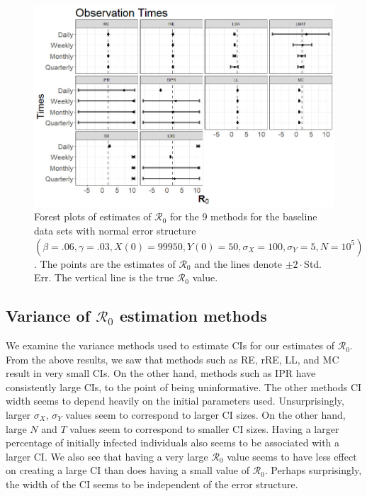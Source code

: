 \documentclass[12pt]{article}
\newcommand{\xxsir}{\ensuremath{9} } %
\newcommand{\rr}{\ensuremath{\mathcal{R}_0}}
\begin{document}
\begin{figure}[H]
	\centering
	\includegraphics[scale=0.5]{images/obs.jpg}
	\caption{Forest plots of estimates of $\rr$ for the \xxsir methods for the baseline data sets with normal error structure $(\beta=.06, \gamma=.03, X(0) = 99950, Y(0)=50, \sigma_X=100, \sigma_Y=5, N=10^5)$.  The points are the estimates of $\rr$ and the lines denote $\pm 2\cdot $Std. Err.  The vertical line is the true $\rr$ value.}\label{fig:obs}
\end{figure}

  





\subsection{Variance of $\rr$ estimation methods}\label{sec:sim-var-res}
We examine the variance methods used to estimate CIs for our estimates of $\rr$.  From the above results, we saw that methods such as RE, rRE, LL, and MC result in very small CIs.  On the other hand, methods such as IPR have consistently large CIs, to the point of being uninformative.  The other methods CI width seems to depend heavily on the initial parameters used.  Unsurprisingly, larger $\sigma_X$, $\sigma_Y$ values seem to correspond to larger CI sizes.  On the other hand, large $N$ and $T$ values seem to correspond to smaller CI sizes.   Having a larger percentage of initially infected individuals also seems to be associated with a larger CI.  We also see that having a very large $\rr$ value seems to have less effect on creating a large CI than does having a small value of $\rr$.  Perhaps surprisingly, the width of the CI seems to be independent of the error structure.
\end{document}
